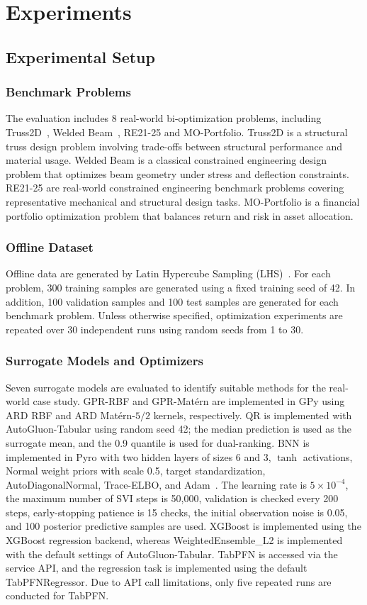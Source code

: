 \documentclass[conference]{IEEEtran}
\begin{document}
\section{Experiments}
\subsection{Experimental Setup}
\subsubsection{Benchmark Problems}
The evaluation includes 8 real-world bi-optimization problems, including Truss2D~\cite{truss2d}, Welded Beam~\cite{welded_beam}, RE21-25 \cite{xue2024offline} and MO-Portfolio. Truss2D is a structural truss design problem involving trade-offs between structural performance and material usage. Welded Beam is a classical constrained engineering design problem that optimizes beam geometry under stress and deflection constraints. RE21-25 are real-world constrained engineering benchmark problems covering representative mechanical and structural design tasks. MO-Portfolio is a financial portfolio optimization problem that balances return and risk in asset allocation.

\subsubsection{Offline Dataset}
Offline data are generated by Latin Hypercube Sampling (LHS)~\cite{sampling}. For each problem, 300 training samples are generated using a fixed training seed of 42. In addition, 100 validation samples and 100 test samples are generated for each benchmark problem. Unless otherwise specified, optimization experiments are repeated over 30 independent runs using random seeds from 1 to 30. 


\subsubsection{Surrogate Models and Optimizers}
Seven surrogate models are evaluated to identify suitable methods for the real-world case study. GPR-RBF and GPR-Mat\'ern are implemented in GPy using ARD RBF and ARD Matérn-$5/2$ kernels, respectively. \gls{QR} is implemented with AutoGluon-Tabular using random seed 42; the median prediction is used as the surrogate mean, and the 0.9 quantile is used for dual-ranking. \gls{BNN} is implemented in Pyro with two hidden layers of sizes 6 and 3, $\tanh$ activations, Normal weight priors with scale 0.5, target standardization, AutoDiagonalNormal, Trace-ELBO, and Adam~\cite{adam}. The learning rate is $5\times10^{-4}$, the maximum number of SVI steps is 50,000, validation is checked every 200 steps, early-stopping patience is 15 checks, the initial observation noise is 0.05, and 100 posterior predictive samples are used. XGBoost is implemented using the XGBoost regression backend, whereas WeightedEnsemble\_L2 is implemented with the default settings of AutoGluon-Tabular. TabPFN is accessed via the service API, and the regression task is implemented using the default TabPFNRegressor. Due to API call limitations, only five repeated runs are conducted for TabPFN.
\end{document}
